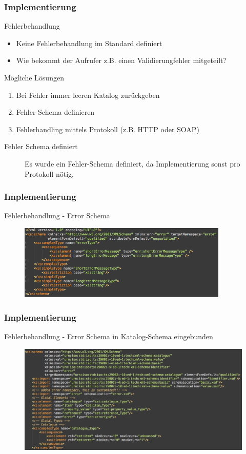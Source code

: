 \documentclass[serif,mathserif]{beamer}
\begin{document}
\begin{frame}
  \frametitle{Implementierung}
 Fehlerbehandlung
  \begin{itemize}
  \item Keine Fehlerbehandlung im Standard definiert
  \item Wie bekommt der Aufrufer z.B. einen Validierungfehler mitgeteilt?
  \end{itemize}
  
 Mögliche Lösungen
   \begin{enumerate}
  \item Bei Fehler immer leeren Katalog zurückgeben 
  \item Fehler-Schema definieren 
  \item Fehlerhandling mittels Protokoll (z.B. HTTP oder SOAP)
  \end{enumerate}
  
  \begin{description}
\item[Fehler Schema definiert] Es wurde ein Fehler-Schema definiert, da Implementierung sonst pro Protokoll nötig. 
\end{description}

  
\end{frame}


 \begin{frame}
  \frametitle{Implementierung}
  Fehlerbehandlung - Error Schema

     \begin{figure}[t]
     \includegraphics[width=10cm]{images/ErrorSchema.png}
     \end{figure}
 \end{frame}

 \begin{frame}
  \frametitle{Implementierung}
  Fehlerbehandlung - Error Schema in Katalog-Schema eingebunden

     \begin{figure}[t]
     \includegraphics[width=11.5cm]{images/ErrorSchemaCatalogue.png}
     \end{figure}
 \end{frame}
\end{document}
